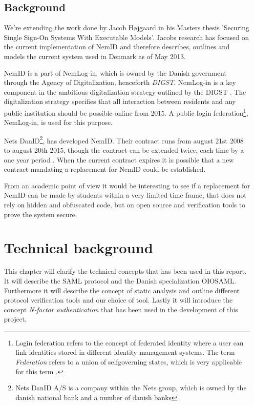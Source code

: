\documentclass[twosided]{report}
\begin{document}
\section{Background}
We're extending the work done by Jacob H{\o}jgaard in his Masters thesis 'Securing Single Sign-On Systems With Executable Models'. Jacobs research has focused on the current implementation of NemID and therefore describes, outlines and models the current system used in Denmark as of May 2013.
\par
NemID is a part of NemLog-in, which is owned by the Danish government through the Agency of Digitalization, henceforth \emph{DIGST}. NemLog-in is a key component in the ambitious digitalization strategy outlined by the DIGST \cite{digst}. The digitalization strategy specifies that all interaction between residents and any public institution should be possible online from 2015. A public login federation\footnote{Login federation refers to the concept of federated identity where a user can link identities stored in different identity management systems. The term \emph{Federation} refers to a union of selfgoverning states, which is very applicable for this term \cite{jacob}.}, NemLog-in, is used for this purpose.
\par
Nets DanID\footnote{Nets DanID A/S is a company within the Nets group, which is owned by the danish national bank and a number of danish banks}, has developed NemID. Their contract runs from august 21st 2008 to august 20th 2015, though the contract can be extended twice, each time by a one year period \cite{nemidcontract}. When the current contract expires it is possible that a new contract mandating a replacement for NemID could be established.
\par
From an academic point of view it would be interesting to see if a replacement for NemID can be made by students within a very limited time frame, that does not rely on hidden and obfuscated code, but on open source and verification tools to prove the system secure.



\chapter{Technical background}
This chapter will clarify the technical concepts that has been used in this report. It will describe the SAML protocol and the Danish specialization OIOSAML. Furthermore it will describe the concept of static analysis and outline different protocol verification tools and our choice of tool. Lastly it will introduce the concept \emph{N-factor authentication} that has been used in the development of this project.
\end{document}
